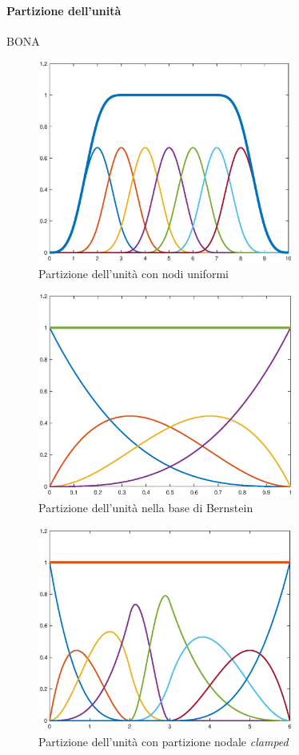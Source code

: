\documentclass[a4paper, 10pt]{article}
\begin{document}
\paragraph{Partizione dell'unità} BONA
\begin{figure}[h]
  \centering
  \includegraphics[width=0.75\textwidth]{figure/unity_std.eps}
  \caption{Partizione dell'unità con nodi uniformi}
  \label{fig:unity_std}
\end{figure} 
\begin{figure}[h]
  \centering
  \includegraphics[width=0.75\textwidth]{figure/unity_bernstein.eps}
  \caption{Partizione dell'unità nella base di Bernstein}
  \label{fig:unity_bernstein}
\end{figure} 
\begin{figure}[h]
  \centering
  \includegraphics[width=0.75\textwidth]{figure/unity_3.eps}
  \caption{Partizione dell'unità con partizione nodale \textit{clamped}}
  \label{fig:unity_clamped}
\end{figure} 
\end{document}
